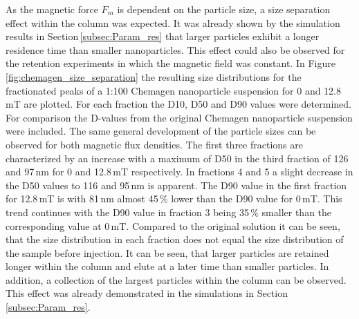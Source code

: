 \FloatBarrier
As the magnetic force $F_{m}$ is dependent on the particle size, a size separation effect within the column was expected. It was already shown by the simulation results in Section\,\ref{subsec:Param_res} that larger particles exhibit a longer residence time than smaller nanoparticles. This effect could also be observed for the retention experiments in which the magnetic field was constant. In Figure\,\ref{fig:chemagen_size_separation} the resulting size distributions for the fractionated peaks of a 1:100 Chemagen nanoparticle suspension for 0 and 12.8\,mT are plotted. For each fraction the D10, D50 and D90 values were determined. For comparison the D-values from the original Chemagen nanoparticle suspension were included. The same general development of the particle sizes can be observed for both magnetic flux densities. The first three fractions are characterized by an increase with a maximum of D50 in the third fraction of 126 and 97\,nm for 0 and 12.8\,mT respectively. In fractions 4 and 5 a slight decrease in the D50 values to 116 and 95\,nm is apparent. The D90 value in the first fraction for 12.8\,mT is with 81\,nm almost 45\,\% lower than the D90 value for 0\,mT. This trend continues with the D90 value in fraction 3 being 35\,\% smaller than the corresponding value at 0\,mT. Compared to the original solution it can be seen, that the size distribution in each fraction does not equal the size distribution of the sample before injection. It can be seen, that larger particles are retained longer within the column and elute at a later time than smaller particles. In addition, a collection of the largest particles within the column can be observed.  This effect was already demonstrated in the simulations in Section\,\ref{subsec:Param_res}.     

